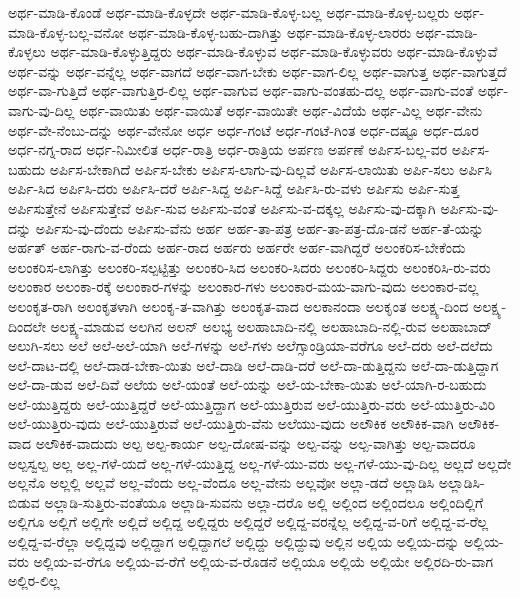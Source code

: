 {ಅರ್ಥ-ಮಾಡಿ-ಕೊಂಡೆ
ಅರ್ಥ-ಮಾಡಿ-ಕೊಳ್ಳದೇ
ಅರ್ಥ-ಮಾಡಿ-ಕೊಳ್ಳ-ಬಲ್ಲ
ಅರ್ಥ-ಮಾಡಿ-ಕೊಳ್ಳ-ಬಲ್ಲರು
ಅರ್ಥ-ಮಾಡಿ-ಕೊಳ್ಳ-ಬಲ್ಲ-ವನೋ
ಅರ್ಥ-ಮಾಡಿ-ಕೊಳ್ಳ-ಬಹು-ದಾಗಿತ್ತು
ಅರ್ಥ-ಮಾಡಿ-ಕೊಳ್ಳ-ಲಾರರು
ಅರ್ಥ-ಮಾಡಿ-ಕೊಳ್ಳಲು
ಅರ್ಥ-ಮಾಡಿ-ಕೊಳ್ಳುತ್ತಿದ್ದರು
ಅರ್ಥ-ಮಾಡಿ-ಕೊಳ್ಳುವ
ಅರ್ಥ-ಮಾಡಿ-ಕೊಳ್ಳುವರು
ಅರ್ಥ-ಮಾಡಿ-ಕೊಳ್ಳುವೆ
ಅರ್ಥ-ವನ್ನು
ಅರ್ಥ-ವನ್ನೆಲ್ಲ
ಅರ್ಥ-ವಾಗದೆ
ಅರ್ಥ-ವಾಗ-ಬೇಕು
ಅರ್ಥ-ವಾಗ-ಲಿಲ್ಲ
ಅರ್ಥ-ವಾಗುತ್ತ
ಅರ್ಥ-ವಾಗುತ್ತದೆ
ಅರ್ಥ-ವಾ-ಗುತ್ತಿದೆ
ಅರ್ಥ-ವಾಗುತ್ತಿರ-ಲಿಲ್ಲ
ಅರ್ಥ-ವಾಗುವ
ಅರ್ಥ-ವಾಗು-ವಂತಹು-ದಲ್ಲ
ಅರ್ಥ-ವಾಗು-ವಂತೆ
ಅರ್ಥ-ವಾಗು-ವು-ದಿಲ್ಲ
ಅರ್ಥ-ವಾಯಿತು
ಅರ್ಥ-ವಾಯಿತೆ
ಅರ್ಥ-ವಾಯಿತೇ
ಅರ್ಥ-ವಿದೆಯೆ
ಅರ್ಥ-ವಿಲ್ಲ
ಅರ್ಥ-ವೇನು
ಅರ್ಥ-ವೇ-ನೆಂಬು-ದನ್ನು
ಅರ್ಥ-ವೇನೋ
ಅರ್ಧ
ಅರ್ಧ-ಗಂಟೆ
ಅರ್ಧ-ಗಂಟೆ-ಗಿಂತ
ಅರ್ಧ-ದಷ್ಟೂ
ಅರ್ಧ-ದೂರ
ಅರ್ಧ-ನಗ್ನ-ರಾದ
ಅರ್ಧ-ನಿಮೀಲಿತ
ಅರ್ಧ-ರಾತ್ರಿ
ಅರ್ಧ-ರಾತ್ರಿಯ
ಅರ್ಪಣ
ಅರ್ಪಣೆ
ಅರ್ಪಿಸ-ಬಲ್ಲ-ವರ
ಅರ್ಪಿಸ-ಬಹುದು
ಅರ್ಪಿಸ-ಬೇಕಾಗಿದೆ
ಅರ್ಪಿಸ-ಬೇಕು
ಅರ್ಪಿಸ-ಲಾಗು-ವು-ದಿಲ್ಲವೆ
ಅರ್ಪಿಸ-ಲಾಯಿತು
ಅರ್ಪಿ-ಸಲು
ಅರ್ಪಿಸಿ
ಅರ್ಪಿ-ಸಿದ
ಅರ್ಪಿಸಿ-ದರು
ಅರ್ಪಿಸಿ-ದರೆ
ಅರ್ಪಿ-ಸಿದ್ದ
ಅರ್ಪಿ-ಸಿದ್ದೆ
ಅರ್ಪಿಸಿ-ರು-ವಳು
ಅರ್ಪಿಸು
ಅರ್ಪಿ-ಸುತ್ತ
ಅರ್ಪಿಸುತ್ತೇನೆ
ಅರ್ಪಿಸುತ್ತೇವೆ
ಅರ್ಪಿ-ಸುವ
ಅರ್ಪಿಸು-ವಂತೆ
ಅರ್ಪಿಸು-ವ-ದಕ್ಕಲ್ಲ
ಅರ್ಪಿಸು-ವು-ದಕ್ಕಾಗಿ
ಅರ್ಪಿಸು-ವು-ದನ್ನು
ಅರ್ಪಿಸು-ವು-ದೆಂದು
ಅರ್ಪಿಸು-ವೆನು
ಅರ್ಹ
ಅರ್ಹ-ತಾ-ಪತ್ರ
ಅರ್ಹ-ತಾ-ಪತ್ರ-ದೊ-ಡನೆ
ಅರ್ಹ-ತೆ-ಯನ್ನು
ಅರ್ಹತ್
ಅರ್ಹ-ರಾಗು-ವ-ರೆಂದು
ಅರ್ಹ-ರಾದ
ಅರ್ಹರು
ಅರ್ಹರೇ
ಅರ್ಹ-ವಾಗಿದ್ದರೆ
ಅಲಂಕರಿಸ-ಬೇಕೆಂದು
ಅಲಂಕರಿಸ-ಲಾಗಿತ್ತು
ಅಲಂಕರಿ-ಸಲ್ಪಟ್ಟಿತ್ತು
ಅಲಂಕರಿ-ಸಿದ
ಅಲಂಕರಿ-ಸಿದರು
ಅಲಂಕರಿ-ಸಿದ್ದರು
ಅಲಂಕರಿಸಿ-ರು-ವರು
ಅಲಂಕಾರ
ಅಲಂಕಾ-ರಕ್ಕೆ
ಅಲಂಕಾರ-ಗಳನ್ನು
ಅಲಂಕಾರ-ಗಳು
ಅಲಂಕಾರ-ಮಯ-ವಾಗು-ವುದು
ಅಲಂಕಾರ-ವಲ್ಲ
ಅಲಂಕೃತ-ರಾಗಿ
ಅಲಂಕೃತಳಾಗಿ
ಅಲಂಕೃ-ತ-ವಾಗಿತ್ತು
ಅಲಂಕೃತ-ವಾದ
ಅಲಕಾನಂದಾ
ಅಲಕೃಂತ
ಅಲಕ್ಷ್ಯ-ದಿಂದ
ಅಲಕ್ಷ್ಯ-ದಿಂದಲೇ
ಅಲಕ್ಷ್ಯ-ಮಾಡುವ
ಅಲಗಿನ
ಅಲನ್
ಅಲಭ್ಯ
ಅಲಹಾಬಾದಿ-ನಲ್ಲಿ
ಅಲಹಾಬಾದಿ-ನಲ್ಲಿ-ರುವ
ಅಲಹಾಬಾದ್
ಅಲುಗಿ-ಸಲು
ಅಲೆ
ಅಲೆ-ಅಲೆ-ಯಾಗಿ
ಅಲೆ-ಗಳನ್ನು
ಅಲೆ-ಗಳು
ಅಲೆಗ್ಸಾಂಡ್ರಿಯಾ-ವರೆಗೂ
ಅಲೆ-ದರು
ಅಲೆ-ದಲೆದು
ಅಲೆ-ದಾಟ-ದಲ್ಲಿ
ಅಲೆ-ದಾಡ-ಬೇಕಾ-ಯಿತು
ಅಲೆ-ದಾಡಿ
ಅಲೆ-ದಾಡಿ-ದರೆ
ಅಲೆ-ದಾ-ಡುತ್ತಿದ್ದನು
ಅಲೆ-ದಾ-ಡುತ್ತಿದ್ದಾಗ
ಅಲೆ-ದಾ-ಡುವ
ಅಲೆ-ದಿವೆ
ಅಲೆಯ
ಅಲೆ-ಯಂತೆ
ಅಲೆ-ಯನ್ನು
ಅಲೆ-ಯ-ಬೇಕಾ-ಯಿತು
ಅಲೆ-ಯಾಗಿ-ರ-ಬಹುದು
ಅಲೆ-ಯುತ್ತಿದ್ದರು
ಅಲೆ-ಯುತ್ತಿದ್ದರೆ
ಅಲೆ-ಯುತ್ತಿದ್ದಾಗ
ಅಲೆ-ಯುತ್ತಿರುವ
ಅಲೆ-ಯುತ್ತಿರು-ವರು
ಅಲೆ-ಯುತ್ತಿರು-ವಿರಿ
ಅಲೆ-ಯುತ್ತಿರು-ವುದು
ಅಲೆ-ಯುತ್ತಿರುವೆ
ಅಲೆ-ಯುತ್ತಿರು-ವೆನು
ಅಲೆಯು-ವುದು
ಅಲೌಕಿಕ
ಅಲೌಕಿಕ-ವಾಗಿ
ಅಲೌಕಿಕ-ವಾದ
ಅಲೌಕಿಕ-ವಾದುದು
ಅಲ್ಪ
ಅಲ್ಪ-ಕಾರ್ಯ
ಅಲ್ಪ-ದೋಷ-ವನ್ನು
ಅಲ್ಪ-ವನ್ನು
ಅಲ್ಪ-ವಾಗಿತ್ತು
ಅಲ್ಪ-ವಾದರೂ
ಅಲ್ಪಸ್ವಲ್ಪ
ಅಲ್ಲ
ಅಲ್ಲ-ಗಳೆ-ಯದೆ
ಅಲ್ಲ-ಗಳೆ-ಯುತ್ತಿದ್ದ
ಅಲ್ಲ-ಗಳೆ-ಯು-ವರು
ಅಲ್ಲ-ಗಳೆ-ಯು-ವು-ದಿಲ್ಲ
ಅಲ್ಲದೆ
ಅಲ್ಲದೇ
ಅಲ್ಲನೊ
ಅಲ್ಲಲ್ಲಿ
ಅಲ್ಲವೆ
ಅಲ್ಲ-ವೆಂದು
ಅಲ್ಲ-ವೆಂದೂ
ಅಲ್ಲ-ವೇನು
ಅಲ್ಲವೋ
ಅಲ್ಲಾ-ಡದೆ
ಅಲ್ಲಾಡಿಸಿ
ಅಲ್ಲಾಡಿಸಿ-ಬಿಡುವ
ಅಲ್ಲಾಡಿ-ಸುತ್ತಿರು-ವಂತೆಯೂ
ಅಲ್ಲಾಡಿ-ಸುವನು
ಅಲ್ಲಾ-ದರೊ
ಅಲ್ಲಿ
ಅಲ್ಲಿಂದ
ಅಲ್ಲಿಂದಲೂ
ಅಲ್ಲಿಂದಿಲ್ಲಿಗೆ
ಅಲ್ಲಿಗೂ
ಅಲ್ಲಿಗೆ
ಅಲ್ಲಿಗೇ
ಅಲ್ಲಿದೆ
ಅಲ್ಲಿದ್ದ
ಅಲ್ಲಿದ್ದರು
ಅಲ್ಲಿದ್ದರೆ
ಅಲ್ಲಿದ್ದ-ವರನ್ನೆಲ್ಲ
ಅಲ್ಲಿದ್ದ-ವ-ರಿಗೆ
ಅಲ್ಲಿದ್ದ-ವ-ರೆಲ್ಲ
ಅಲ್ಲಿದ್ದ-ವ-ರೆಲ್ಲಾ
ಅಲ್ಲಿದ್ದವು
ಅಲ್ಲಿದ್ದಾಗ
ಅಲ್ಲಿದ್ದಾಗಲೆ
ಅಲ್ಲಿದ್ದು
ಅಲ್ಲಿದ್ದುವು
ಅಲ್ಲಿನ
ಅಲ್ಲಿಯ
ಅಲ್ಲಿಯ-ದನ್ನು
ಅಲ್ಲಿಯ-ವರು
ಅಲ್ಲಿಯ-ವ-ರೆಗೂ
ಅಲ್ಲಿಯ-ವ-ರೆಗೆ
ಅಲ್ಲಿಯ-ವ-ರೊಡನೆ
ಅಲ್ಲಿಯೂ
ಅಲ್ಲಿಯೆ
ಅಲ್ಲಿಯೇ
ಅಲ್ಲಿರದಿ-ರು-ವಾಗ
ಅಲ್ಲಿರ-ಲಿಲ್ಲ
}
